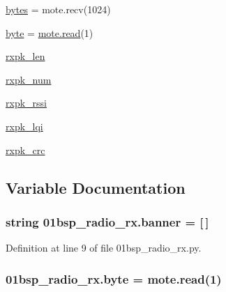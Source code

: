\begin{DoxyCompactItemize}
\hyperlink{namespace01bsp__radio__rx_ac80177cbe4706dd415309201ae9a0531}{bytes} = mote.\+recv(1024)
\item 
\hyperlink{namespace01bsp__radio__rx_aa35c32b2ed69689c69b2ee0eebde7510}{byte} = \hyperlink{imu__loop_8c_af97f6049272bceaff32e108f006ecc97}{mote.\+read}(1)
\item 
\hyperlink{namespace01bsp__radio__rx_a61531cf1011a6bdd829422b751c13b86}{rxpk\+\_\+len}
\item 
\hyperlink{namespace01bsp__radio__rx_a2963f3702c3b835e5b64b2edb9d91378}{rxpk\+\_\+num}
\item 
\hyperlink{namespace01bsp__radio__rx_a5373bfab07d770f91d33b002d6a8f6b1}{rxpk\+\_\+rssi}
\item 
\hyperlink{namespace01bsp__radio__rx_a555c0a333aa1e223a81d28495f6ceb23}{rxpk\+\_\+lqi}
\item 
\hyperlink{namespace01bsp__radio__rx_a5d7d1fbf5723c2918de7500e9e50dce7}{rxpk\+\_\+crc}
\end{DoxyCompactItemize}


\subsection{Variable Documentation}
\subsubsection[{\texorpdfstring{banner}{banner}}]{\setlength{\rightskip}{0pt plus 5cm}string 01bsp\+\_\+radio\+\_\+rx.\+banner = \mbox{[}$\,$\mbox{]}}\hypertarget{namespace01bsp__radio__rx_ac941cf5e2831ceb1c533dd8058d39380}{}\label{namespace01bsp__radio__rx_ac941cf5e2831ceb1c533dd8058d39380}


Definition at line 9 of file 01bsp\+\_\+radio\+\_\+rx.\+py.

\subsubsection[{\texorpdfstring{byte}{byte}}]{\setlength{\rightskip}{0pt plus 5cm}01bsp\+\_\+radio\+\_\+rx.\+byte = {\bf mote.\+read}(1)}\hypertarget{namespace01bsp__radio__rx_aa35c32b2ed69689c69b2ee0eebde7510}{}\label{namespace01bsp__radio__rx_aa35c32b2ed69689c69b2ee0eebde7510}


